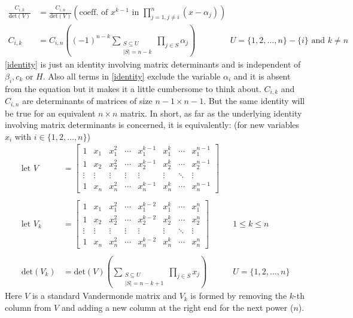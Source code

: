 \documentclass{article}
\begin{document}
\begin{align}
    \frac{C_{i,k}}{\textrm{det}(V)} &= \frac{C_{i,n}}{\textrm{det}(V)}\left(\textrm{coeff. of $x^{k-1}$ in } \prod_{j=1, j\neq i}^{n} (x-\alpha_j)\right) \\
    C_{i,k} &= C_{i,n}\left( (-1)^{n-k} \sum_{\substack{S \subseteq U \\ |S| = n-k}}\prod_{j\in S} \alpha_j\right) && U = \{1,2,\dots,n\} - \{i\} \textrm{ and } k\neq n \label{identity}
\end{align}
\eqref{identity} is just an identity involving matrix determinants and is independent of $\beta_i, c_k$ or $H$. Also all terms in \eqref{identity} exclude the variable $\alpha_i$ and it is absent from the equation but it makes it a little cumbersome to think about. $C_{i,k}$ and $C_{i,n}$ are determinants of matrices of size $n-1 \times n-1$. But the same identity will be true for an equivalent $n \times n$ matrix. In short, as far as the underlying identity involving matrix determinants is concerned, it is equivalently: (for new variables $x_i$ with $i\in\{1,2,\dots,n\}$)
\begin{align*}
    \textrm{let } V &= \begin{bmatrix}
        1 & x_1 & x_1^2 & \cdots & x_1^{k-1} & x_1^{k} & \cdots & x_1^{n-1} \\
        1 & x_2 & x_2^2 & \cdots & x_2^{k-1} & x_2^{k} & \cdots & x_2^{n-1} \\
        \vdots & \vdots & \vdots & \vdots & \vdots & \vdots & \ddots & \vdots \\
        1 & x_{n} & x_{n}^2 & \cdots & x_{n}^{k-1} & x_{n}^{k} & \cdots & x_{n}^{n-1}
    \end{bmatrix}\\\\
    \textrm{let } V_k &= \begin{bmatrix}
        1 & x_1 & x_1^2 & \cdots & x_1^{k-2} & x_1^{k} & \cdots & x_1^{n} \\
        1 & x_2 & x_2^2 & \cdots & x_2^{k-2} & x_2^{k} & \cdots & x_2^{n} \\
        \vdots & \vdots & \vdots & \vdots & \vdots & \vdots & \ddots & \vdots \\
        1 & x_{n} & x_{n}^2 & \cdots & x_{n}^{k-2} & x_{n}^{k} & \cdots & x_{n}^{n}
    \end{bmatrix} && 1\leq k\leq n\\\\
    \textrm{det}(V_k) &= \textrm{det}(V)\left(
    \sum_{\substack{S \subseteq U \\ |S| = n-k+1}}\prod_{j\in S} x_j
    \right) && U = \{1,2,\dots,n\}
\end{align*}
Here $V$ is a standard Vandermonde matrix and $V_k$ is formed by removing the $k$-th column from $V$ and adding a new column at the right end for the next power ($n$).
\end{document}
